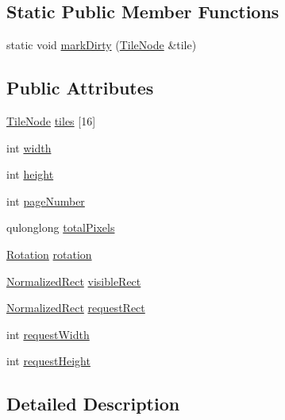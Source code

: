 \subsection*{Static Public Member Functions}
\begin{DoxyCompactItemize}
\item 
static void \hyperlink{classTilesManager_1_1Private_aded21e0985bbdc16ebd8cbae6ab40b6c}{mark\+Dirty} (\hyperlink{classOkular_1_1TileNode}{Tile\+Node} \&tile)
\end{DoxyCompactItemize}
\subsection*{Public Attributes}
\begin{DoxyCompactItemize}
\item 
\hyperlink{classOkular_1_1TileNode}{Tile\+Node} \hyperlink{classTilesManager_1_1Private_a012e2cd82b699c8338004bb96dfc0402}{tiles} \mbox{[}16\mbox{]}
\item 
int \hyperlink{classTilesManager_1_1Private_ac3e9434c1fb99eea9c4fc150d9143496}{width}
\item 
int \hyperlink{classTilesManager_1_1Private_a3a34c3fae7f5b48be600e1bf2cf8536f}{height}
\item 
int \hyperlink{classTilesManager_1_1Private_ad4869e0390201b58e4b767795d98191d}{page\+Number}
\item 
qulonglong \hyperlink{classTilesManager_1_1Private_a74bd95bdb8cf49921bba8f59db98ba9d}{total\+Pixels}
\item 
\hyperlink{namespaceOkular_a8556d00465f61ef533c6b027669e7da6}{Rotation} \hyperlink{classTilesManager_1_1Private_a7f3af32831b85f1c108fb428b9f634d2}{rotation}
\item 
\hyperlink{classOkular_1_1NormalizedRect}{Normalized\+Rect} \hyperlink{classTilesManager_1_1Private_abc6e4b8356815117fa81618fb4a1e714}{visible\+Rect}
\item 
\hyperlink{classOkular_1_1NormalizedRect}{Normalized\+Rect} \hyperlink{classTilesManager_1_1Private_a7202a07fb2d4f9d1035b6e65429cc37d}{request\+Rect}
\item 
int \hyperlink{classTilesManager_1_1Private_a7fde18a61cf409f683df576fb56592b7}{request\+Width}
\item 
int \hyperlink{classTilesManager_1_1Private_a5b4e13663b908b60adc0ee7fab832bb9}{request\+Height}
\end{DoxyCompactItemize}


\subsection{Detailed Description}


